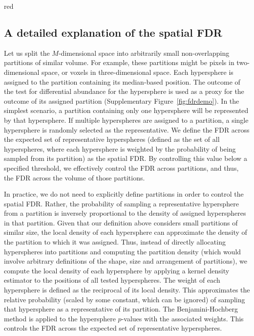 \documentclass{article}
\begin{document}
\begin{color}{red}
\subsection{A detailed explanation of the spatial FDR}
Let us split the $M$-dimensional space into arbitrarily small non-overlapping partitions of similar volume.
For example, these partitions might be pixels in two-dimensional space, or voxels in three-dimensional space.
Each hypersphere is assigned to the partition containing its median-based position.
The outcome of the test for differential abundance for the hypersphere is used as a proxy for the outcome of its assigned partition (Supplementary Figure~\ref{fig:fdrdemo}).
In the simplest scenario, a partition containing only one hypersphere will be represented by that hypersphere.
If multiple hyperspheres are assigned to a partition, a single hypersphere is randomly selected as the representative.
We define the FDR across the expected set of representative hyperspheres (defined as the set of all hyperspheres, where each hypersphere is weighted by the probability of being sampled from its partition) as the spatial FDR.
By controlling this value below a specified threshold, we effectively control the FDR across partitions, and thus, the FDR across the volume of those partitions.

In practice, we do not need to explicitly define partitions in order to control the spatial FDR.
Rather, the probability of sampling a representative hypersphere from a partition is inversely proportional to the density of assigned hyperspheres in that partition.
Given that our definition above considers small partitions of similar size, the local density of each hypersphere can approximate the density of the partition to which it was assigned.
Thus, instead of directly allocating hyperspheres into partitions and computing the partition density (which would involve arbitrary definitions of the shape, size and arrangement of partitions), we compute the local density of each hypersphere by applying a kernel density estimator to the positions of all tested hyperspheres.
The weight of each hypersphere is defined as the reciprocal of its local density.
This approximates the relative probability (scaled by some constant, which can be ignored) of sampling that hypersphere as a representative of its partition.
The Benjamini-Hochberg method is applied to the hypersphere $p$-values with the associated weights.
This controls the FDR across the expected set of representative hyperspheres.


\end{color}
\end{document}
